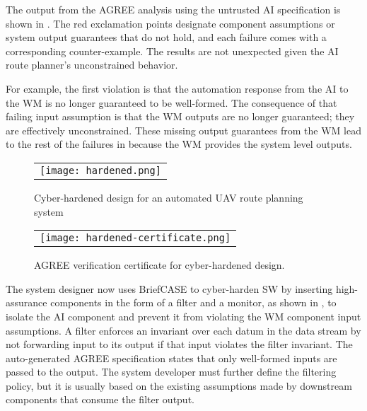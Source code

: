 The output from the AGREE analysis using the untrusted AI
specification is shown in .  The red
exclamation points designate component assumptions or system output
guarantees that do not hold, and each failure comes with a
corresponding counter-example.  The results are not unexpected given
the AI route planner's unconstrained behavior.

For example, the first violation is that the automation response from
the AI to the WM is no longer guaranteed to be well-formed.  The
consequence of that failing input assumption is that the WM outputs
are no longer guaranteed; they are effectively unconstrained.  These
missing output guarantees from the WM lead to the rest of the failures
in  because the WM provides the system
level outputs.

\begin{figure*}
  \begin{center}
    \begin{tabular}{c}
      \texttt{[image: hardened.png]}
    \end{tabular}
  \end{center}
  \caption{Cyber-hardened design for an automated UAV route planning system}
  \label{fig:hardened}
\end{figure*}

\begin{figure}
  \begin{center}
    \begin{tabular}{c}
      \texttt{[image: hardened-certificate.png]}
    \end{tabular}
  \end{center}
  \caption{AGREE verification certificate for cyber-hardened design.}
  \label{fig:hardened-certificate}
\end{figure}

The system designer now uses BriefCASE to cyber-harden SW by inserting
high-assurance components in the form of a filter and a monitor, as
shown in , to isolate the AI component and prevent it from violating the WM component input assumptions.
A filter enforces an invariant over
each datum in the data stream by not forwarding input to its output if
that input violates the filter invariant.  The auto-generated AGREE
specification states that only well-formed inputs are passed to the
output.  The system developer must further define the filtering
policy, but it is usually based on the existing assumptions made by
downstream components that consume the filter output.

